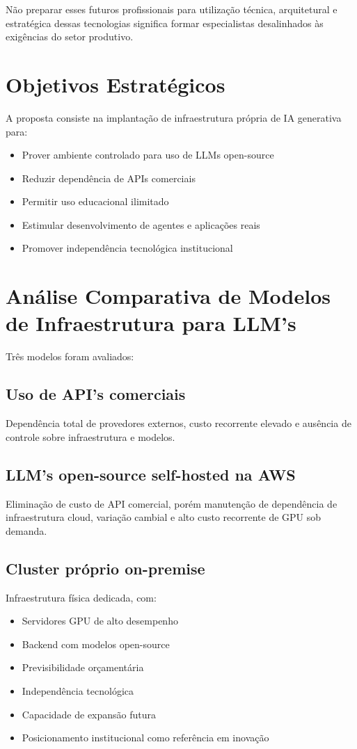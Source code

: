 \documentclass[12pt,a4paper,]{abntex2}
\begin{document}
Não preparar esses futuros profissionais para utilização técnica, arquitetural e estratégica dessas tecnologias significa formar especialistas desalinhados às exigências do setor produtivo.

\section{Objetivos Estratégicos}
A proposta consiste na implantação de infraestrutura própria de IA generativa para:

\begin{itemize}
\item Prover ambiente controlado para uso de LLMs open-source
\item Reduzir dependência de APIs comerciais
\item Permitir uso educacional ilimitado
\item Estimular desenvolvimento de agentes e aplicações reais
\item Promover independência tecnológica institucional
\end{itemize}

\section{Análise Comparativa de Modelos de Infraestrutura para LLM's}
Três modelos foram avaliados:

\subsection{Uso de API's comerciais}
Dependência total de provedores externos, custo recorrente elevado e ausência de controle sobre infraestrutura e modelos.

\subsection{LLM's open-source self-hosted na AWS}
Eliminação de custo de API comercial, porém manutenção de dependência de infraestrutura cloud, variação cambial e alto custo recorrente de GPU sob demanda.

\subsection{Cluster próprio on-premise}
Infraestrutura física dedicada, com:
\begin{itemize}
\item Servidores GPU de alto desempenho
\item Backend com modelos open-source
\item Previsibilidade orçamentária
\item Independência tecnológica
\item Capacidade de expansão futura
\item Posicionamento institucional como referência em inovação
\end{itemize}
\end{document}
